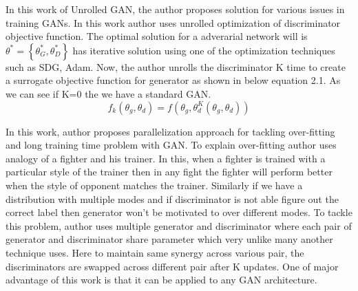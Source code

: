 In this work of Unrolled GAN, the author proposes solution for various issues in training GANs. 
In this work author uses unrolled optimization of discriminator objective function.  The optimal solution for a adverarial network will is $\theta^{*} =\left\{\theta^{*}_{G}, \theta^{*}_{D}\right\}$ has iterative solution using one of the optimization techniques such as SDG, Adam. Now, the author unrolls the discriminator K time to create a surrogate objective function for generator as shown in below equation 2.1. As we can see if K=0 the we have a standard GAN.
\begin{equation}
f_{k}{ \left( \theta _{g}, \theta _{d} \right) }=f \left( \theta _{g}, \theta _{d}^{K}{ \left( \theta _{g}, \theta _{d} \right) } \right)
\end{equation}

In this work, author proposes parallelization approach for tackling over-fitting and long training time problem with GAN. To explain over-fitting author uses analogy of a fighter and his trainer. In this, when a fighter is trained with a particular style of the trainer then in any fight the fighter will perform better when the style of opponent matches the trainer. Similarly if  we have a distribution with multiple modes and if discriminator is not able figure out the correct label then generator won't be motivated to over different modes. To tackle this problem, author uses multiple generator and discriminator where each pair of generator and discriminator share parameter which very unlike many another technique uses. Here to maintain same synergy across various pair, the discriminators are swapped across different pair after K updates.  One of major advantage of this work is that it can be applied to any GAN architecture.

